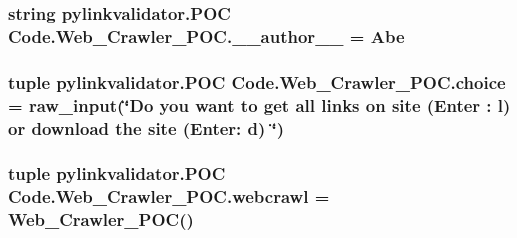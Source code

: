 \subsubsection[{\+\_\+\+\_\+author\+\_\+\+\_\+}]{\setlength{\rightskip}{0pt plus 5cm}string pylinkvalidator.\+P\+OC Code.\+Web\+\_\+\+Crawler\+\_\+\+P\+O\+C.\+\_\+\+\_\+author\+\_\+\+\_\+ = \textquotesingle{}Abe\textquotesingle{}}\hypertarget{namespacepylinkvalidator_1_1_p_o_c_01_code_1_1_web___crawler___p_o_c_a22c868491c11af4cb64226ff9b053b32}{}\label{namespacepylinkvalidator_1_1_p_o_c_01_code_1_1_web___crawler___p_o_c_a22c868491c11af4cb64226ff9b053b32}
\subsubsection[{choice}]{\setlength{\rightskip}{0pt plus 5cm}tuple pylinkvalidator.\+P\+OC Code.\+Web\+\_\+\+Crawler\+\_\+\+P\+O\+C.\+choice = raw\+\_\+input(\char`\"{}Do you want to get all links on site (Enter \+: l) or download the site (Enter\+: d) \char`\"{})}\hypertarget{namespacepylinkvalidator_1_1_p_o_c_01_code_1_1_web___crawler___p_o_c_a4666fce36918603f23fdc35bf9439a79}{}\label{namespacepylinkvalidator_1_1_p_o_c_01_code_1_1_web___crawler___p_o_c_a4666fce36918603f23fdc35bf9439a79}
\subsubsection[{webcrawl}]{\setlength{\rightskip}{0pt plus 5cm}tuple pylinkvalidator.\+P\+OC Code.\+Web\+\_\+\+Crawler\+\_\+\+P\+O\+C.\+webcrawl = {\bf Web\+\_\+\+Crawler\+\_\+\+P\+OC}()}\hypertarget{namespacepylinkvalidator_1_1_p_o_c_01_code_1_1_web___crawler___p_o_c_a6207ec383f50bd418bb20f680ae55e1a}{}\label{namespacepylinkvalidator_1_1_p_o_c_01_code_1_1_web___crawler___p_o_c_a6207ec383f50bd418bb20f680ae55e1a}
